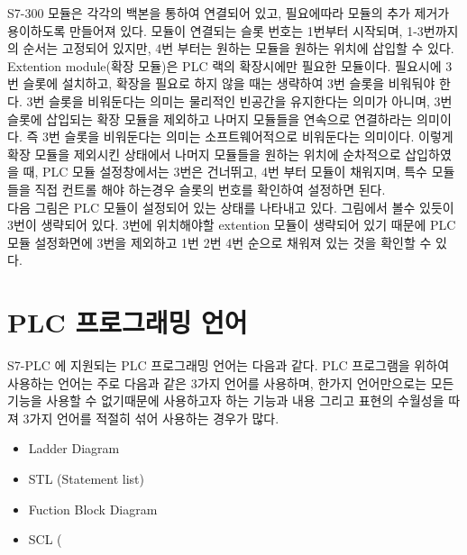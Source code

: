 \documentclass[11pt
  , a4paper
  , article
  , oneside
]{memoir}
\begin{document}
S7-300 모듈은 각각의 백본을 통하여 연결되어 있고, 필요에따라 모듈의 추가 제거가 용이하도록 만들어져 있다. 모듈이 연결되는 슬롯 번호는 1번부터 시작되며, 1-3번까지의 순서는 고정되어 있지만, 4번 부터는 원하는 모듈을 원하는 위치에 삽입할 수 있다.\\
\newline Extention module(확장 모듈)은 PLC 랙의 확장시에만 필요한 모듈이다. 필요시에 3번 슬롯에 설치하고, 확장을 필요로 하지 않을 때는 생략하여 3번 슬롯을 비워둬야 한다. 3번 슬롯을 비워둔다는 의미는 물리적인 빈공간을 유지한다는 의미가 아니며, 3번 슬롯에 삽입되는 확장 모듈을 제외하고 나머지 모듈들을 연속으로 연결하라는 의미이다. 즉 3번 슬롯을 비워둔다는 의미는 소프트웨어적으로 비워둔다는 의미이다. 이렇게 확장 모듈을 제외시킨 상태에서 나머지 모듈들을 원하는 위치에 순차적으로 삽입하였을 때, PLC 모듈 설정창에서는 3번은 건너뛰고, 4번 부터 모듈이 채워지며, 특수 모듈들을 직접 컨트롤 해야 하는경우 슬롯의 번호를 확인하여 설정하면 된다.\\
\newline 다음 그림은 PLC 모듈이 설정되어 있는 상태를 나타내고 있다. 그림에서 볼수 있듯이 3번이 생략되어 있다. 3번에 위치해야할 extention 모듈이 생략되어 있기 때문에 PLC 모듈 설정화면에 3번을 제외하고 1번 2번 4번 순으로 채워져 있는 것을 확인할 수 있다.\\


\section{PLC 프로그래밍 언어}
 S7-PLC 에 지원되는 PLC 프로그래밍 언어는 다음과 같다. PLC 프로그램을 위하여 사용하는 언어는 주로 다음과 같은 3가지 언어를 사용하며, 한가지 언어만으로는 모든 기능을 사용할 수 없기때문에 사용하고자 하는 기능과 내용 그리고 표현의 수월성을 따져 3가지 언어를 적절히 섞어 사용하는 경우가 많다.

\begin{itemize}
\item Ladder Diagram
\item STL (Statement list)
\item Fuction Block Diagram
\item SCL (
\end{itemize}
\end{document}
